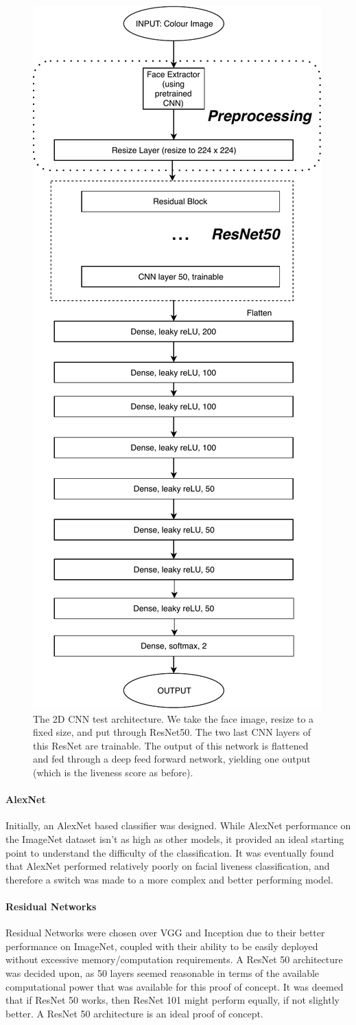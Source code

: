 \documentclass[10pt,a4paper]{article}
\begin{document}
                \begin{figure}
                    \centering
                    \includegraphics[width=0.3\linewidth]{2DCNNArchitecture.pdf}
                    \caption{The 2D CNN test architecture. We take the face image, resize to a fixed size, and put through ResNet50. The two last CNN layers
                    of this ResNet are trainable. The output of this network is flattened and fed through a deep feed forward network, yielding one output (which is the
                    liveness score as before).}
                    \label{2DCNNArchitecture}
                \end{figure}


                \paragraph{AlexNet}
                Initially, an AlexNet based classifier was designed. While AlexNet performance on the ImageNet dataset isn't as high as other models, it provided an ideal starting point to understand the difficulty
                of the classification. It was eventually found that AlexNet performed relatively poorly on facial liveness classification, and therefore a switch was made to a more complex and better performing model.

                \paragraph{Residual Networks}
                Residual Networks were chosen over VGG and Inception due to their better performance on ImageNet, coupled with their ability to be easily deployed without excessive memory/computation requirements.
                A ResNet 50 architecture was decided upon, as 50 layers seemed reasonable in terms of the available computational power that was available for this proof of concept. It was deemed that if ResNet 50 works, then ResNet 101 might perform equally, if not
                slightly better. A ResNet 50 architecture is an ideal proof of concept.
\end{document}
